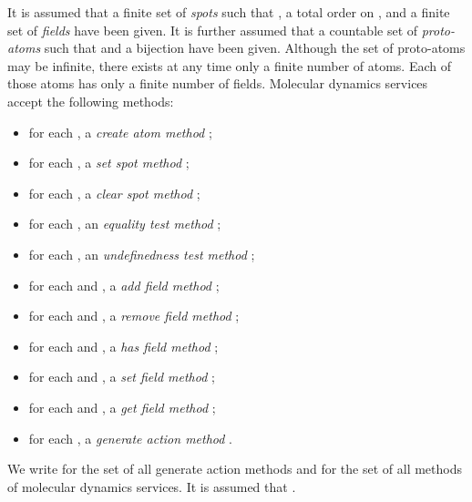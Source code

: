 \documentclass[fleqn]{llncs}
\begin{document}
It is assumed that a finite set  of \emph{spots} such that
, a total order  on , and a
finite set  of \emph{fields} have been given.
It is further assumed that a countable set  of
\emph{proto-atoms} such that  and a bijection
 have been given.
Although the set of proto-atoms may be infinite, there exists at any
time only a finite number of atoms.
Each of those atoms has only a finite number of fields.
Molecular dynamics services accept the following methods:
\begin{itemize}
\item
for each , a \emph{create atom method} ;
\item
for each , a \emph{set spot method} ;
\item
for each , a \emph{clear spot method} ;
\item
for each ,
an \emph{equality test method} ;
\item
for each ,
an \emph{undefinedness test method} ;
\item
for each  and ,
a \emph{add field method} ;
\item
for each  and ,
a \emph{remove field method} ;
\item
for each  and ,
a \emph{has field method} ;
\item
for each  and ,
a \emph{set field method} ;
\item
for each  and ,
a \emph{get field method} ;
\item
for each ,
a \emph{generate action method} .
\end{itemize}
We write  for the set of all generate action methods and
 for the set of all methods of molecular dynamics services.
It is assumed that .
\end{document}
